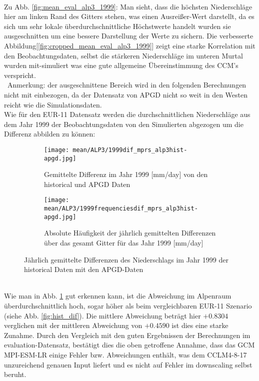 \\
Zu Abb. \ref{fig:mean_eval_alp3_1999}: Man sieht, dass die höchsten Niederschläge hier am linken Rand des Gitters stehen, was einen Ausreißer-Wert darstellt, da es sich um sehr lokale überdurchschnittliche Höchstwerte handelt wurden sie ausgeschnitten um eine bessere Darstellung der Werte zu sichern. Die verbesserte Abbildung[\ref{fig:cropped_mean_eval_alp3_1999}] zeigt eine starke Korrelation mit den Beobachtungsdaten, selbst die stärkeren Niederschläge im unteren Murtal wurden mit-simuliert was eine gute allgemeine Übereinstimmung des CCM's verspricht.\\\
Anmerkung: der ausgeschnittene Bereich wird in den folgenden Berechnungen nicht mit einbezogen, da der Datensatz von APGD nicht so weit in den Westen reicht wie die Simulationsdaten.\\
Wie für den EUR-11 Datensatz werden die durchschnittlichen Niederschläge aus dem Jahr 1999 der Beobachtungsdaten von den Simulierten abgezogen um die Differenz abbilden zu können:\\
\begin{figure}[hbt!]
	\begin{subfigure}{0.49\textwidth}
		\texttt{[image: mean/ALP3/1999dif\_mprs\_alp3hist-apgd.jpg]}
		\caption{Gemittelte Differenz im Jahr 1999 [mm/day] von den historical und APGD Daten}
		\label{fig:dif_hist_apgd_1999}
	\end{subfigure}
	\begin{subfigure}{0.49\textwidth}
		\texttt{[image: mean/ALP3/1999frequenciesdif\_mprs\_alp3hist-apgd.jpg]}
		\caption{Absolute Häufigkeit der jährlich gemittelten Differenzen über das gesamt Gitter für das Jahr 1999 [mm/day]}
		\label{fig:freq_dif_hist_apgd_1999}
	\end{subfigure}
	\caption{Jährlich gemittelte Differenzen des Niederschlags im Jahr 1999 der historical Daten mit den APGD-Daten}
\end{figure}
\\
Wie man in Abb. \ref{fig:dif_hist_apgd_1999} gut erkennen kann, ist die Abweichung im Alpenraum überdurchschnittlich hoch, sogar höher als beim vergleichbaren EUR-11 Szenario (siehe Abb. \ref{fig:hist_dif}). Die mittlere Abweichung beträgt hier $+0.8304$ verglichen mit der mittleren Abweichung von $+0.4590$ ist dies eine starke Zunahme. Durch den Vergleich mit den guten Ergebnissen der Berechnungen im evaluation-Datensatz, bestätigt dies die oben getroffene Annahme, dass das GCM MPI-ESM-LR einige Fehler bzw. Abweichungen enthält, was dem CCLM4-8-17 unzureichend genauen Input liefert und es nicht auf Fehler im downscaling selbst beruht.\\
